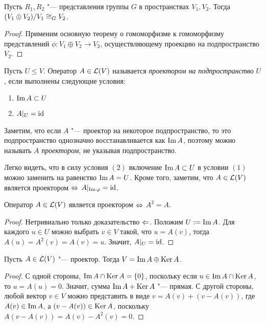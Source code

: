 \begin{proposition}
	Пусть $R_1, R_2$ "--- представления группы $G$ в пространствах $V_1, V_2$. Тогда $(V_1 \oplus V_2) / V_1 \cong_G V_2$.
\end{proposition}

\begin{proof}
	Применим основную теорему о гомоморфизме к гомоморфизму представлений $\phi: V_1 \oplus V_2 \to V_2$, осуществляющему проекцию на подпространство $V_2$.
\end{proof}

\begin{definition}
	Пусть $U \le V$. Оператор $A \in \mathcal L(V)$ называется \textit{проектором на подпространство} $U$, если выполнены следующие условия:
	\begin{enumerate}
		\item $\operatorname{Im} A \subset U$
		\item $A|_{U} = \mathrm{id}$
	\end{enumerate}

	Заметим, что если $A$ "--- проектор на некоторое подпространство, то это подпространство однозначно восстанавливается как $\operatorname{Im} A$, поэтому можно называть $A$ \textit{проектором}, не указывая подпространство.
\end{definition}

\begin{note}
	Легко видеть, что в силу условия $(2)$ включение $\operatorname{Im} A \subset U$ в условии $(1)$ можно заменить на равенство $\operatorname{Im} A = U$. Кроме того, заметим, что $A \in \mathcal L(V)$ является проектором $\Leftrightarrow$ $A|_{\operatorname{Im}\varphi} = \mathrm{id}$.
\end{note}

\begin{proposition}
	Оператор $A \in \mathcal L(V)$ является проектором $\Leftrightarrow$ $A^2 = A$.
\end{proposition}

\begin{proof}
	Нетривиально только доказательство $\Leftarrow$. Положим $U := \operatorname{Im}{A}$. Для каждого $u \in U$ можно выбрать $v \in V$ такой, что $u = A(v)$, тогда $A(u) = A^2(v) = A(v) = u$. Значит, $A|_U = \mathrm{id}$.
\end{proof}

\begin{proposition}
	Пусть $A \in \mathcal L(V)$ "--- проектор. Тогда $V = \operatorname{Im}{A} \oplus \operatorname{Ker}{A}$.
\end{proposition}

\begin{proof}
	С одной стороны, $\operatorname{Im}{A} \cap \operatorname{Ker}{A} = \{0\}$, поскольку если $u \in \operatorname{Im}{A} \cap \operatorname{Ker}{A}$, то $u = A(u) = 0$. Значит, сумма $\operatorname{Im}{A} + \operatorname{Ker}{A}$ "--- прямая. С другой стороны, любой вектор $v \in V$ можно представить в виде $v = A(v) + (v - A(v))$, где $A(v) \in \operatorname{Im}{A}$, а $(v - A(v)) \in \operatorname{Ker}{A}$, поскольку $A(v - A(v)) = A(v) - A^2(v) = 0$.
\end{proof}

